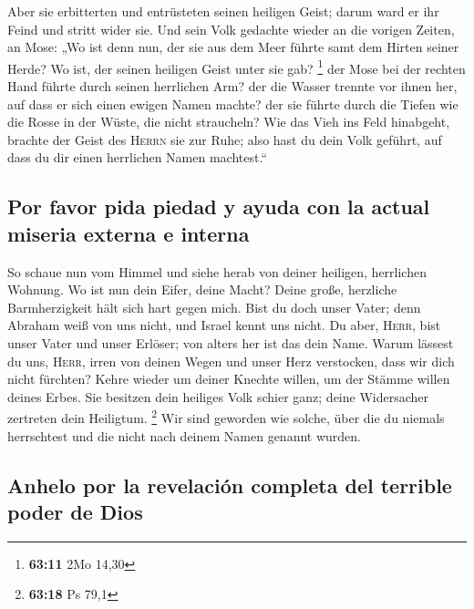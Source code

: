  Aber sie erbitterten und entrüsteten seinen heiligen
Geist; darum ward er ihr Feind und stritt wider sie.  Und
sein Volk gedachte wieder an die vorigen Zeiten, an Mose: „Wo ist denn
nun, der sie aus dem Meer führte samt dem Hirten seiner Herde? Wo ist,
der seinen heiligen Geist unter sie gab? \footnote{\textbf{63:11} 2Mo
  14,30}  der Mose bei der rechten Hand führte durch
seinen herrlichen Arm? der die Wasser trennte vor ihnen her, auf dass er
sich einen ewigen Namen machte?  der sie führte durch die
Tiefen wie die Rosse in der Wüste, die nicht straucheln? 
Wie das Vieh ins Feld hinabgeht, brachte der Geist des \textsc{Herrn}
sie zur Ruhe; also hast du dein Volk geführt, auf dass du dir einen
herrlichen Namen machtest.``

\hypertarget{por-favor-pida-piedad-y-ayuda-con-la-actual-miseria-externa-e-interna}{%
\subsection{Por favor pida piedad y ayuda con la actual miseria externa
e
interna}\label{por-favor-pida-piedad-y-ayuda-con-la-actual-miseria-externa-e-interna}}

 So schaue nun vom Himmel und siehe herab von deiner
heiligen, herrlichen Wohnung. Wo ist nun dein Eifer, deine Macht? Deine
große, herzliche Barmherzigkeit hält sich hart gegen mich.
 Bist du doch unser Vater; denn Abraham weiß von uns
nicht, und Israel kennt uns nicht. Du aber, \textsc{Herr}, bist unser
Vater und unser Erlöser; von alters her ist das dein Name.
 Warum lässest du uns, \textsc{Herr}, irren von deinen
Wegen und unser Herz verstocken, dass wir dich nicht fürchten? Kehre
wieder um deiner Knechte willen, um der Stämme willen deines Erbes.
 Sie besitzen dein heiliges Volk schier ganz; deine
Widersacher zertreten dein Heiligtum. \footnote{\textbf{63:18} Ps 79,1}
 Wir sind geworden wie solche, über die du niemals
herrschtest und die nicht nach deinem Namen genannt wurden.

\hypertarget{anhelo-por-la-revelaciuxf3n-completa-del-terrible-poder-de-dios}{%
\subsection{Anhelo por la revelación completa del terrible poder de
Dios}\label{anhelo-por-la-revelaciuxf3n-completa-del-terrible-poder-de-dios}}

